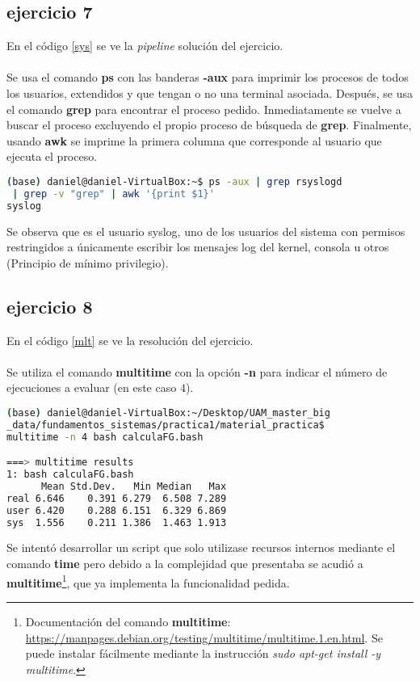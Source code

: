 \subsection*{ejercicio 7}
%
En el código \ref{sys} se ve la \textit{pipeline} solución del ejercicio.\\\\
Se usa el comando \textbf{ps} con las banderas \textbf{-aux} para imprimir los procesos de todos los usuarios, extendidos y que tengan o no una terminal asociada. Después, se usa el comando \textbf{grep} para encontrar el proceso pedido. Inmediatamente se vuelve a buscar el proceso excluyendo el propio proceso de búsqueda de \textbf{grep}. Finalmente, usando \textbf{awk} se imprime la primera columna que corresponde al usuario que ejecuta el proceso.
\begin{lstlisting}[language=bash,caption={Usuario que ha ejecutado el proceso rsyslogd}, label={sys}]
(base) daniel@daniel-VirtualBox:~$ ps -aux | grep rsyslogd
 | grep -v "grep" | awk '{print $1}'
syslog
\end{lstlisting}
Se observa que es el usuario syslog, uno de los usuarios del sistema con permisos restringidos a únicamente escribir los mensajes log del kernel, consola u otros (Principio de mínimo privilegio). 
\subsection*{ejercicio 8}
%
En el código \ref{mlt} se ve la resolución del ejercicio.\\\\
Se utiliza el comando \textbf{multitime} con la opción \textbf{-n} para indicar el número de ejecuciones a evaluar (en este caso $4$).
\begin{lstlisting}[language=bash,caption={Tiempo de ejecución del script \textit{calculaFG.bash}}, label={mlt}]
(base) daniel@daniel-VirtualBox:~/Desktop/UAM_master_big
_data/fundamentos_sistemas/practica1/material_practica$ 
multitime -n 4 bash calculaFG.bash

===> multitime results
1: bash calculaFG.bash
      Mean Std.Dev.   Min Median   Max
real 6.646    0.391 6.279  6.508 7.289       
user 6.420    0.288 6.151  6.329 6.869       
sys  1.556    0.211 1.386  1.463 1.913      
\end{lstlisting}
Se intentó desarrollar un script que solo utilizase recursos internos mediante el comando \textbf{time} pero debido a la complejidad que presentaba se acudió a \textbf{multitime}\footnote{Documentación del comando \textbf{multitime}: \url{https://manpages.debian.org/testing/multitime/multitime.1.en.html}. Se puede instalar fácilmente mediante la instrucción \textit{sudo apt-get install -y multitime}.}, que ya implementa la funcionalidad pedida.
